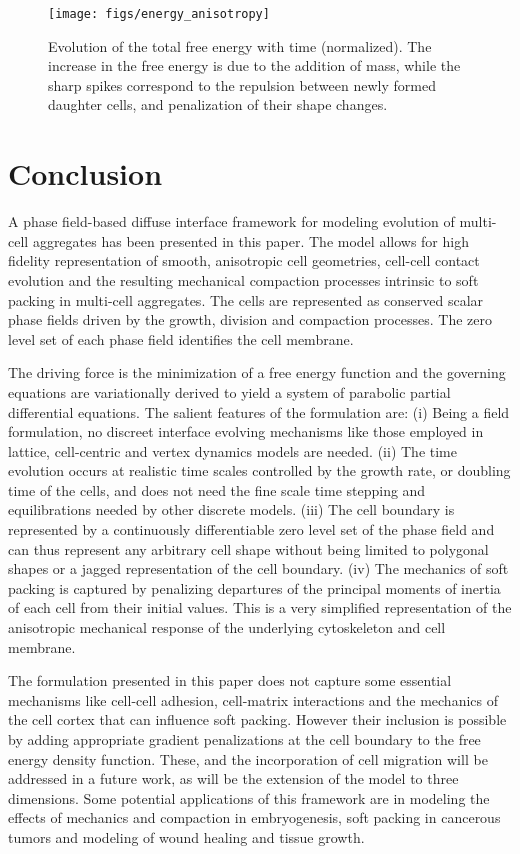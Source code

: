 \documentclass{article}
\begin{document}
\begin{figure}[h!]
\centering
\texttt{[image: figs/energy\_anisotropy]}
\caption{Evolution of the total free energy with time (normalized). The increase in the free energy is due to the addition of mass, while the sharp spikes correspond to the repulsion between newly formed daughter cells, and penalization of their shape changes.}
\label{fig:energy_anisotropy}
\end{figure}

\section{Conclusion}
\label{sec:concl}
A phase field-based diffuse interface framework for modeling evolution of multi-cell aggregates has been presented in this paper. The model allows for high fidelity representation of smooth, anisotropic cell geometries, cell-cell contact evolution and the resulting mechanical compaction processes intrinsic to soft packing in multi-cell aggregates. The cells are represented as conserved scalar phase fields driven by the growth, division and compaction processes. The zero level set of each phase field identifies the cell membrane. 

The driving force is the minimization of a free energy function and the governing equations are variationally derived to yield a system of parabolic partial differential equations. The salient features of the formulation are: (i) Being a field formulation, no discreet interface evolving mechanisms like those employed in lattice, cell-centric and vertex dynamics models are needed. (ii) The time evolution occurs at realistic time scales controlled by the growth rate, or doubling time of the cells, and does not need the fine scale time stepping  and equilibrations needed by other discrete models. (iii) The cell boundary is represented by a continuously differentiable zero level set of the phase field and can thus represent any arbitrary cell shape without being limited to polygonal shapes or a jagged representation of the cell boundary. (iv) The mechanics of soft packing is captured by penalizing departures of the principal moments of inertia of each cell from their initial values. This is a very simplified representation of the anisotropic mechanical response of the underlying cytoskeleton and cell membrane.

The formulation presented in this paper does not capture some essential mechanisms like cell-cell adhesion, cell-matrix interactions and the mechanics of the cell cortex that can influence soft packing. However their inclusion is possible by adding appropriate gradient penalizations at the cell boundary to the free energy density function. These, and the incorporation of cell migration will be addressed in a future work, as will be the extension of the model to three dimensions. Some potential applications of this framework are in modeling the effects of mechanics and compaction in embryogenesis, soft packing in cancerous tumors and modeling of wound healing and tissue growth. 



\end{document}
